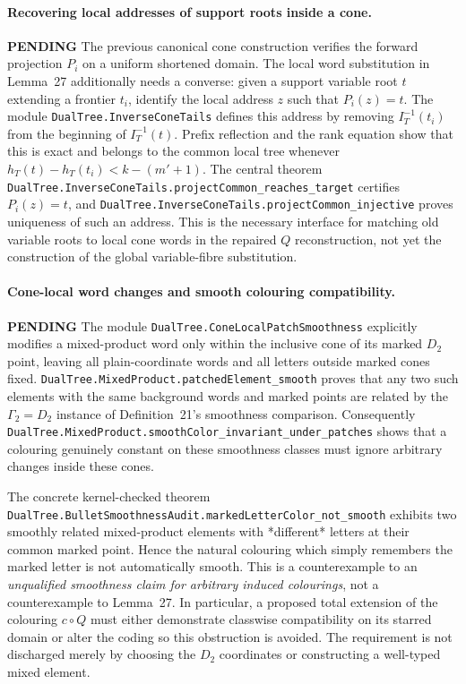 \documentclass[11pt]{article}
\newcommand{\todo}{\textcolor{gray!70!black}{\textbf{PENDING}}}
\newcommand{\lean}[1]{\texttt{#1}}
\begin{document}
\paragraph{Recovering local addresses of support roots inside a cone.} \todo
The previous canonical cone construction verifies the forward
projection $P_i$ on a uniform shortened domain.  The local word
substitution in Lemma~27 additionally needs a converse: given a
support variable root $t$ extending a frontier $t_i$, identify
the local address $z$ such that $P_i(z)=t$.
The module \lean{DualTree.InverseConeTails} defines this address
by removing $I_T^{-1}(t_i)$ from the beginning of $I_T^{-1}(t)$.
Prefix reflection and the rank equation show that this is exact
and belongs to the common local tree whenever
$h_T(t)-h_T(t_i)<k-(m'+1)$.
The central theorem
\lean{DualTree.InverseConeTails.projectCommon_reaches_target}
certifies $P_i(z)=t$, and
\lean{DualTree.InverseConeTails.projectCommon_injective}
proves uniqueness of such an address.
This is the necessary interface for matching old variable roots to
local cone words in the repaired $Q$ reconstruction, not yet the
construction of the global variable-fibre substitution.


\paragraph{Cone-local word changes and smooth colouring compatibility.} \todo
The module \lean{DualTree.ConeLocalPatchSmoothness} explicitly modifies
a mixed-product word only within the inclusive cone of its marked
$D_2$ point, leaving all plain-coordinate words and all letters
outside marked cones fixed.
\lean{DualTree.MixedProduct.patchedElement_smooth}
proves that any two such elements with the same background words and
marked points are related by the $\Gamma_2=D_2$ instance of
Definition~21's smoothness comparison.  Consequently
\lean{DualTree.MixedProduct.smoothColor_invariant_under_patches}
shows that a colouring genuinely constant on these smoothness
classes must ignore arbitrary changes inside these cones.

The concrete kernel-checked theorem
\lean{DualTree.BulletSmoothnessAudit.markedLetterColor_not_smooth}
exhibits two smoothly related mixed-product elements with
*different* letters at their common marked point.  Hence the natural
colouring which simply remembers the marked letter is not automatically
smooth.  This is a counterexample to an \emph{unqualified smoothness
claim for arbitrary induced colourings}, not a counterexample to
Lemma~27.  In particular, a proposed total extension of the colouring
$c\circ Q$ must either demonstrate classwise compatibility on its
starred domain or alter the coding so this obstruction is avoided.
The requirement is not discharged merely by choosing the $D_2$
coordinates or constructing a well-typed mixed element.
\end{document}
